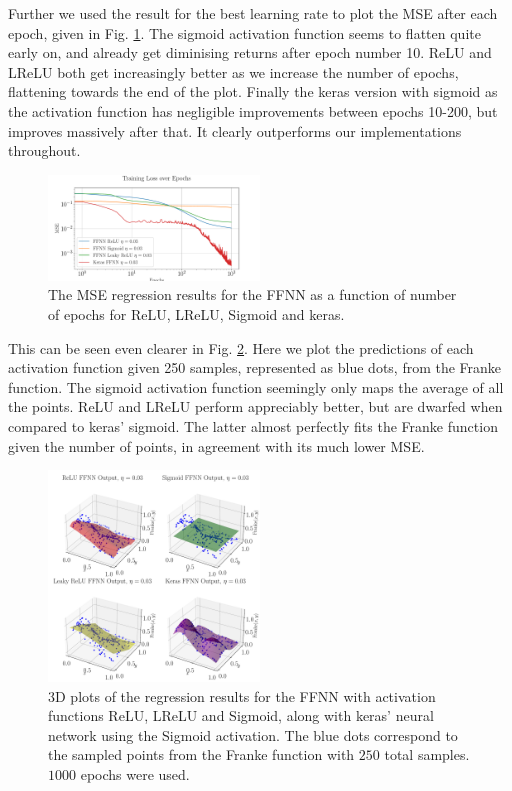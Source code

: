 \documentclass[%
reprint,
amsmath,amssymb,
aps,
]{revtex4-2}
\begin{document}
Further we used the result for the best learning rate to plot the MSE after each epoch, given in Fig. \ref{fig:NN_Franke_Epochs}. The sigmoid activation function seems to flatten quite early on, and already get diminising returns after epoch number 10. ReLU and LReLU both get increasingly better as we increase the number of epochs, flattening towards the end of the plot. Finally the keras version with sigmoid as the activation function has negligible improvements between epochs 10-200, but improves massively after that. It clearly outperforms our implementations throughout. 
\begin{figure}
	\includegraphics[width=0.5\textwidth]{Python/Figures/NN_MSE_Franke_Epoch.pdf}
	\caption{The MSE regression results for the FFNN as a function of number of epochs for ReLU, LReLU, Sigmoid and keras.}
	\label{fig:NN_Franke_Epochs}
\end{figure}

This can be seen even clearer in Fig. \ref{fig:3D_Franke}. Here we plot the predictions of each activation function given 250 samples, represented as blue dots, from the Franke function. The sigmoid activation function seemingly only maps the average of all the points. ReLU and LReLU perform appreciably better, but are dwarfed when compared to keras' sigmoid. The latter almost perfectly fits the Franke function given the number of points, in agreement with its much lower MSE.
\begin{figure}
\centering
\includegraphics[width=0.5\textwidth]{Python/Figures/NN_3D_Predict_Franke_Epochs1000.pdf}
\caption{3D plots of the regression results for the FFNN with activation functions ReLU, LReLU and Sigmoid, along with keras' neural network using the Sigmoid activation. The blue dots correspond to the sampled points from the Franke function with $250$ total samples. $1000$ epochs were used.}
\label{fig:3D_Franke}
\end{figure}
\end{document}

